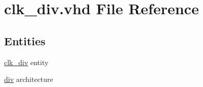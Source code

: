 \hypertarget{clk__div_8vhd}{}\section{clk\+\_\+div.\+vhd File Reference}
\label{clk__div_8vhd}
\subsection*{Entities}
\begin{DoxyCompactItemize}
\item 
\hyperlink{classclk__div}{clk\+\_\+div} entity
\item 
\hyperlink{classclk__div_1_1div}{div} architecture
\end{DoxyCompactItemize}
